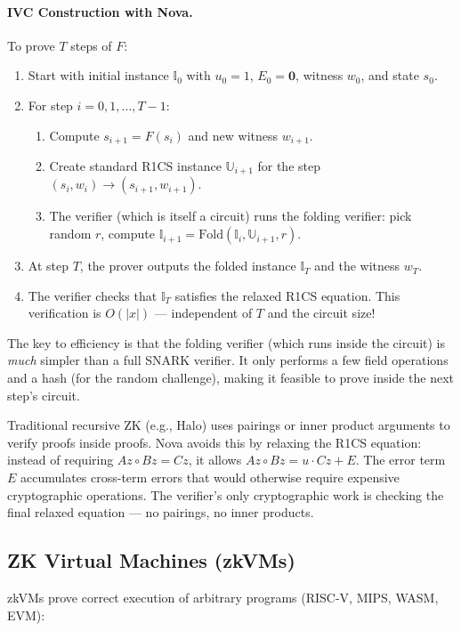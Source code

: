 \paragraph{IVC Construction with Nova.} To prove $T$ steps of $F$:
\begin{enumerate}
\item Start with initial instance $\mathbb{I}_0$ with $u_0=1$, $E_0=\mathbf{0}$, witness $w_0$, and state $s_0$.
\item For step $i = 0, 1, \dots, T-1$:
  \begin{enumerate}
  \item Compute $s_{i+1} = F(s_i)$ and new witness $w_{i+1}$.
  \item Create standard R1CS instance $\mathbb{U}_{i+1}$ for the step $(s_i, w_i) \to (s_{i+1}, w_{i+1})$.
  \item The verifier (which is itself a circuit) runs the folding verifier: pick random $r$, compute $\mathbb{I}_{i+1} = \text{Fold}(\mathbb{I}_i, \mathbb{U}_{i+1}, r)$.
  \end{enumerate}
\item At step $T$, the prover outputs the folded instance $\mathbb{I}_T$ and the witness $w_T$.
\item The verifier checks that $\mathbb{I}_T$ satisfies the relaxed R1CS equation. This verification is $O(|x|)$ --- independent of $T$ and the circuit size!
\end{enumerate}
The key to efficiency is that the folding verifier (which runs inside the circuit) is \emph{much} simpler than a full SNARK verifier. It only performs a few field operations and a hash (for the random challenge), making it feasible to prove inside the next step's circuit.

Traditional recursive ZK (e.g., Halo) uses pairings or inner product arguments to verify proofs inside proofs. Nova avoids this by relaxing the R1CS equation: instead of requiring $Az \circ Bz = Cz$, it allows $Az \circ Bz = u \cdot Cz + E$. The error term $E$ accumulates cross-term errors that would otherwise require expensive cryptographic operations. The verifier's only cryptographic work is checking the final relaxed equation --- no pairings, no inner products.

\subsection{ZK Virtual Machines (zkVMs)}
\label{sec:zk:zkvm}

zkVMs prove correct execution of arbitrary programs (RISC-V, MIPS, WASM, EVM):

